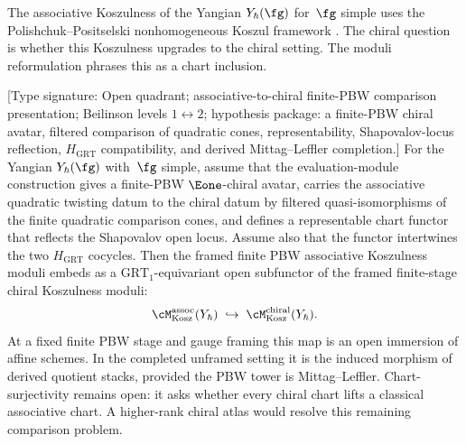 The associative Koszulness of the Yangian $Y_\hbar(\fg)$
for~$\fg$ simple uses the Polishchuk--Positselski nonhomogeneous
Koszul framework \cite{Positselski11}. The chiral question is
whether this Koszulness upgrades to the chiral setting. The
moduli reformulation phrases this as a chart inclusion.

\begin{theorem}
\label{v1-thm:kms-yangian-embedding}
\ClaimStatusConditional
\textup{[Type signature: Open quadrant; associative-to-chiral
finite-PBW comparison presentation; Beilinson levels
$1\leftrightarrow2$; hypothesis package: a finite-PBW chiral avatar,
filtered comparison of quadratic cones, representability,
Shapovalov-locus reflection, $H_{\mathrm{GRT}}$ compatibility, and
derived Mittag--Leffler completion.]}
For the Yangian $Y_\hbar(\fg)$ with~$\fg$ simple, assume that the
evaluation-module construction gives a finite-PBW $\Eone$-chiral
avatar, carries the associative quadratic twisting datum to the
chiral datum by filtered quasi-isomorphisms of the finite quadratic
comparison cones, and defines a representable chart functor that
reflects the Shapovalov open locus.  Assume also that the functor
intertwines the two $H_{\mathrm{GRT}}$ cocycles. Then the framed
finite PBW associative Koszulness moduli embeds as a
$\mathrm{GRT}_1$-equivariant open subfunctor of the framed
finite-stage chiral Koszulness moduli:
\[
\cM^{\mathrm{assoc}}_{\mathrm{Kosz}}(Y_\hbar)
\;\hookrightarrow\;
\cM^{\mathrm{chiral}}_{\mathrm{Kosz}}(Y_\hbar).
\]
At a fixed finite PBW stage and gauge framing this map is an
open immersion of affine schemes. In the completed unframed
setting it is the induced morphism of derived quotient stacks,
provided the PBW tower is Mittag--Leffler. Chart-surjectivity remains
open: it asks whether every chiral chart lifts a classical
associative chart.  A higher-rank chiral atlas would resolve this
remaining comparison problem.
\end{theorem}

